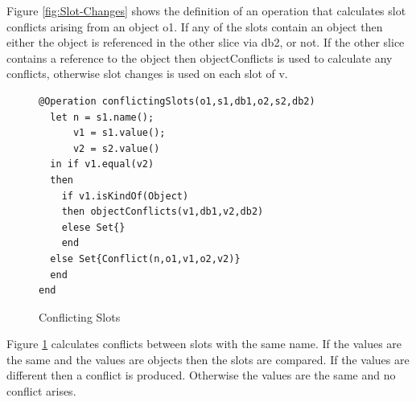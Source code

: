 Figure \ref{fig:Slot-Changes} shows the definition of an operation
that calculates slot conflicts arising from an object o1. If any of
the slots contain an object then either the object is referenced in
the other slice via db2, or not. If the other slice contains a reference
to the object then objectConflicts is used to calculate any conflicts,
otherwise slot changes is used on each slot of v.

%
\begin{figure}
\hfill{}\begin{lstlisting}
@Operation conflictingSlots(o1,s1,db1,o2,s2,db2)
  let n = s1.name();
      v1 = s1.value();
      v2 = s2.value()
  in if v1.equal(v2)
  then 
    if v1.isKindOf(Object)
    then objectConflicts(v1,db1,v2,db2)
    elese Set{}
    end
  else Set{Conflict(n,o1,v1,o2,v2)}
  end
end
\end{lstlisting}\hfill{}

\caption{Conflicting Slots\label{fig:Conflicting-Slots}}

\end{figure}


Figure \ref{fig:Conflicting-Slots} calculates conflicts between slots
with the same name. If the values are the same and the values are
objects then the slots are compared. If the values are different then
a conflict is produced. Otherwise the values are the same and no conflict
arises.


